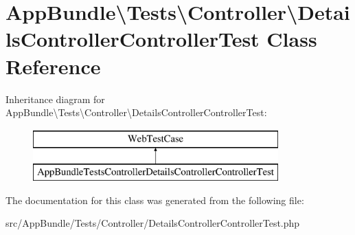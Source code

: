 \hypertarget{class_app_bundle_1_1_tests_1_1_controller_1_1_details_controller_controller_test}{}\section{App\+Bundle\textbackslash{}Tests\textbackslash{}Controller\textbackslash{}Details\+Controller\+Controller\+Test Class Reference}
\label{class_app_bundle_1_1_tests_1_1_controller_1_1_details_controller_controller_test}
Inheritance diagram for App\+Bundle\textbackslash{}Tests\textbackslash{}Controller\textbackslash{}Details\+Controller\+Controller\+Test\+:\begin{figure}[H]
\begin{center}
\leavevmode
\includegraphics[height=2.000000cm]{class_app_bundle_1_1_tests_1_1_controller_1_1_details_controller_controller_test}
\end{center}
\end{figure}


The documentation for this class was generated from the following file\+:\begin{DoxyCompactItemize}
\item 
src/\+App\+Bundle/\+Tests/\+Controller/Details\+Controller\+Controller\+Test.\+php\end{DoxyCompactItemize}
